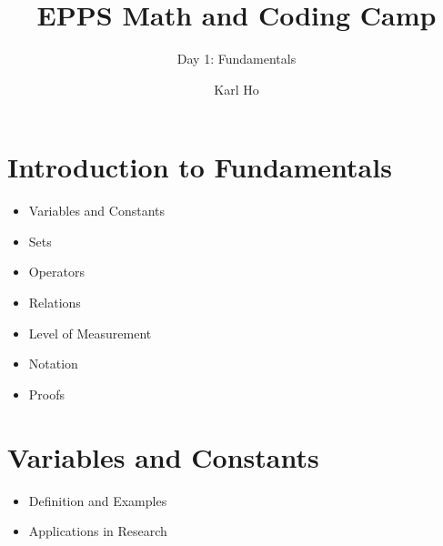 \documentclass[
  11pt,
  letterpaper,
  DIV=11,
  numbers=noendperiod]{scrartcl}
\title{EPPS Math and Coding Camp}
\subtitle{Day 1: Fundamentals}
\author{Karl Ho}
\date{}
\providecommand{\tightlist}{%
  \setlength{\itemsep}{0pt}\setlength{\parskip}{0pt}}\usepackage{longtable,booktabs,array}
\begin{document}
\maketitle

\section{Introduction to
Fundamentals}\label{introduction-to-fundamentals}

\begin{itemize}
\tightlist
\item
  Variables and Constants
\end{itemize}

\begin{itemize}
\tightlist
\item
  Sets
\end{itemize}

\begin{itemize}
\tightlist
\item
  Operators
\end{itemize}

\begin{itemize}
\tightlist
\item
  Relations
\end{itemize}

\begin{itemize}
\tightlist
\item
  Level of Measurement
\end{itemize}

\begin{itemize}
\tightlist
\item
  Notation
\end{itemize}

\begin{itemize}
\tightlist
\item
  Proofs
\end{itemize}

\section{Variables and Constants}\label{variables-and-constants}

\begin{itemize}
\tightlist
\item
  Definition and Examples
\end{itemize}

\begin{itemize}
\tightlist
\item
  Applications in Research
\end{itemize}
\end{document}
